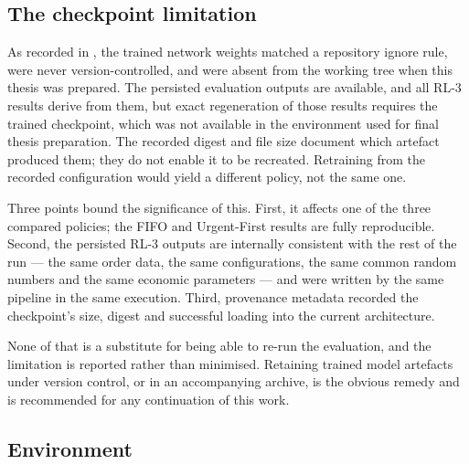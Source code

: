 \subsection{The checkpoint limitation}

As recorded in , the trained network weights matched a repository ignore rule, were
never version-controlled, and were absent from the working tree when this thesis was prepared.
The persisted evaluation outputs are available, and all RL-3 results derive from them, but exact
regeneration of those results requires the trained checkpoint, which was not available in the
environment used for final thesis preparation. The recorded digest and file size document which
artefact produced them; they do not enable it to be recreated. Retraining from the recorded
configuration would yield a different policy, not the same one.

Three points bound the significance of this. First, it affects one of the three compared
policies; the FIFO and Urgent-First results are fully reproducible. Second, the persisted RL-3
outputs are internally consistent with the rest of the run --- the same order data, the same
configurations, the same common random numbers and the same economic parameters --- and were
written by the same pipeline in the same execution. Third, provenance metadata recorded the
checkpoint's size, digest and successful loading into the current architecture.

None of that is a substitute for being able to re-run the evaluation, and the limitation is
reported rather than minimised. Retaining trained model artefacts under version control, or in
an accompanying archive, is the obvious remedy and is recommended for any continuation of this
work.

\subsection{Environment}

